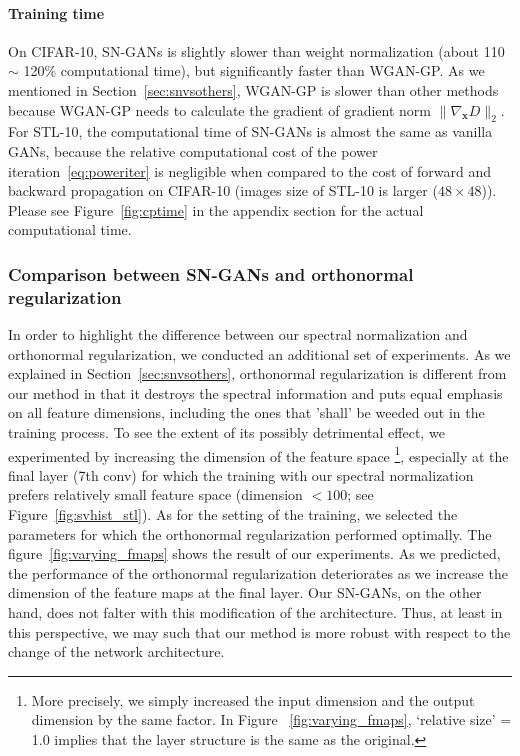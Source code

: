 \paragraph{Training time} On CIFAR-10, SN-GANs is slightly slower than weight normalization (about 110 $\sim$ 120\% computational time), but significantly faster than WGAN-GP. As we mentioned in Section~\ref{sec:snvsothers}, WGAN-GP is slower than other methods because WGAN-GP needs to calculate the gradient of gradient norm $\|\nabla_{{\bm x}} D\|_2$.
For STL-10, the computational time of SN-GANs is almost the same as vanilla GANs, because the relative computational cost of the power iteration~\eqref{eq:poweriter} is negligible when compared to the cost of forward and backward propagation on CIFAR-10 (images size of STL-10 is larger ($48 \times 48$)). Please see Figure~\ref{fig:cptime} in the appendix section for the actual computational time.

\subsubsection{Comparison between SN-GANs and orthonormal regularization} \label{sec:compare_agstORTH} 

In order to highlight the difference between our spectral normalization and orthonormal regularization, we conducted an additional set of experiments. As we explained in Section~\ref{sec:snvsothers}, orthonormal regularization is different from our method in that it destroys the spectral information and puts equal emphasis on all feature dimensions, including the ones that 'shall' be weeded out in the training process. To see the extent of its possibly detrimental effect, we experimented by increasing the dimension of the feature space \footnote{More precisely, we simply increased the input dimension and the output dimension by the same factor. In Figure ~\ref{fig:varying_fmaps}, `relative size' = 1.0 implies that the layer structure is the same as the original.}, especially at the final layer (7th conv) for which the training with our spectral normalization prefers relatively small feature space (dimension $<100$; see Figure~\ref{fig:svhist_stl}). 
As for the setting of the training, we selected the parameters for which the orthonormal regularization performed optimally. The figure~\ref{fig:varying_fmaps} shows the result of our experiments. As we predicted, the performance of the orthonormal regularization deteriorates as we increase the dimension of the feature maps at the final layer. Our SN-GANs, on the other hand, does not falter with this modification of the architecture. Thus, at least in this perspective, we may such that our method is more robust with respect to the change of the network architecture.

